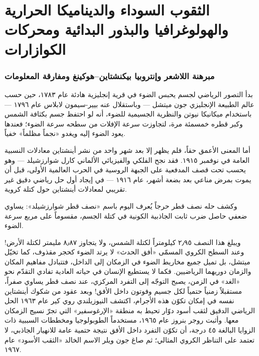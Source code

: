 \documentclass[12pt,a4paper,openany]{book}
\begin{document}
\chapter*{الثقوب السوداء والديناميكا الحرارية والهولوغرافيا والبذور البدائية ومحركات الكوازارات}




\subsection*{مبرهنة اللاشعر وإنتروبيا بيكنشتاين–هوكينغ ومفارقة المعلومات}

بدأ التصور الرياضي لجسم يحبس الضوء في قرية إنجليزية هادئة عام ١٧٨٣، حين حسب عالم الطبيعة الإنجليزي جون ميتشل — وباستقلال عنه بيير-سيمون لابلاس عام ١٧٩٦ — باستخدام ميكانيكا نيوتن والنظرية الجسيمية للضوء، أنه لو احتفظ جسم بكثافة الشمس وكبر قطره خمسمئة مرة، لتجاوزت سرعة الإفلات من سطحه سرعة الضوء؛ فعندها يعود الضوء إليه ويغدو «نجماً مظلماً» خفياً.


أما المعنى الأعمق حقاً، فلم يظهر إلا بعد شهر واحد من نشر أينشتاين معادلات النسبية العامة في نوفمبر ١٩١٥. فقد نجح الفلكي والفيزيائي الألماني كارل شوارزشيلد — وهو يحسب تحت قصف المدفعية على الجبهة الروسية في الحرب العالمية الأولى، قبل أن يموت بمرض مناعي بعد بضعة أشهر، عام ١٩١٦ — في إيجاد أول حل رياضي دقيق غير تقريبي لمعادلات أينشتاين حول كتلة كروية.


وكشف حله نصف قطر حرجاً يُعرف اليوم باسم «نصف قطر شوارزشيلد»: يساوي ضعفي حاصل ضرب ثابت الجاذبية الكونية في كتلة الجسم، مقسوماً على مربع سرعة الضوء.


ويبلغ هذا النصف ٢٫٩٥ كيلومتراً لكتلة الشمس، ولا يتجاوز ٨٫٨٧ مليمتر لكتلة الأرض! وعند السطح الكروي المسمّى «أفق الحدث» لا يرتد الضوء كحجر مقذوف، كما تخيّل ميتشل، بل تميل جميع مخاريط الضوء في الزمكان إلى الداخل، فتتبادل مفاهيم المكان والزمان دوريهما الرياضيين. فكما لا يستطيع الإنسان في حياته العادية تفادي التقدّم نحو «الغد» في الزمن، يصبح التوجّه إلى التفرد المركزي، عند نصف قطر يساوي صفراً، مستقبلاً زمنياً حتمياً لكل جسيم وفوتون داخل الأفق! وبعد عقود من شكوك أينشتاين نفسه في إمكان تكوّن هذه الأجرام، اكتشف النيوزيلندي روي كير عام ١٩٦٣ الحل الرياضي الدقيق لثقب أسود دوّار تحيط به منطقة «الإرغوسفير» التي تجرّ نسيج الزمكان معها. وأثبت روجر بنروز عام ١٩٦٥، مستخدماً الطوبولوجيا ومخططات السببية ذات الزوايا البالغة ٤٥ درجة، أن تكوّن التفرد داخل الأفق نتيجة حتمية عامة للانهيار الجاذبي، لا تعتمد على التناظر الكروي المثالي؛ ثم صاغ جون ويلر الاسم الخالد «الثقب الأسود» عام ١٩٦٧.
\end{document}
